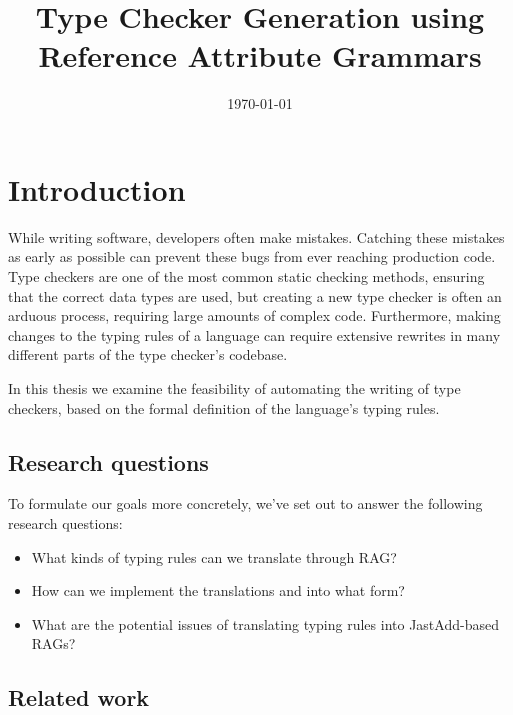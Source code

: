 \documentclass[nofilelist]{cslthse-msc}
\title{Type Checker Generation using Reference Attribute Grammars}
\date{\today}
\begin{document}
\renewcommand{\bibname}{References}

\makefrontmatter
\chapter{Introduction} %
While writing software, developers often make mistakes.
Catching these mistakes as early as possible can prevent these bugs from ever reaching production code.
Type checkers are one of the most common static checking methods, ensuring that the correct data types are used, but creating a new type checker is often an arduous process, requiring large amounts of complex code.
Furthermore, making changes to the typing rules of a language can require extensive rewrites in many different parts of the type checker's codebase.

In this thesis we examine the feasibility of automating the writing of type checkers, based on the formal definition of the language's typing rules.

\section{Research questions}
To formulate our goals more concretely, we've set out to answer the following research questions:
\newcommand{\rqone}{What kinds of typing rules can we translate through RAG?}
\newcommand{\rqtwo}{How can we implement the translations and into what form?}
\newcommand{\rqthree}{What are the potential issues of translating typing rules into JastAdd-based RAGs?}
\begin{itemize}
  \item \rqone
  \item \rqtwo
  \item \rqthree
\end{itemize}

\section{Related work} %
\end{document}
